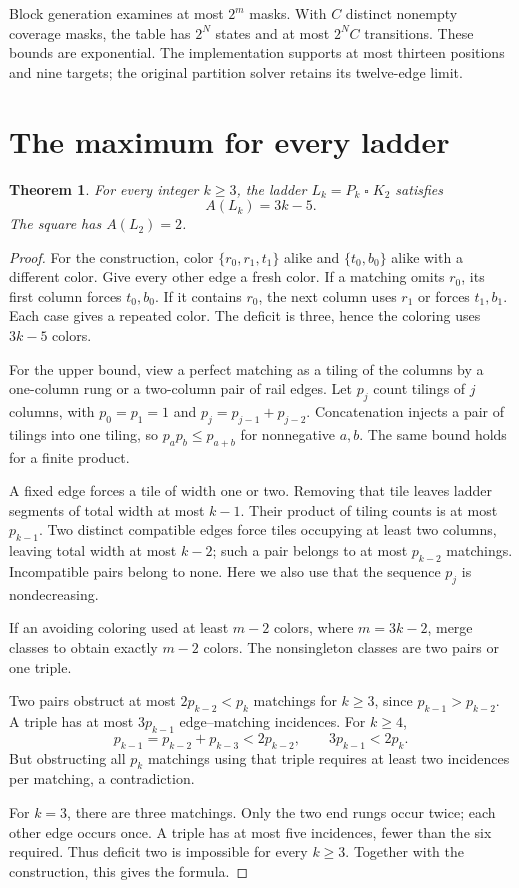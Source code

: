 \documentclass[11pt,letterpaper]{article}
\newtheorem{theorem}{Theorem}
\begin{document}
Block generation examines at most $2^m$ masks. With $C$ distinct nonempty
coverage masks, the table has $2^N$ states and at most $2^N C$ transitions.
These bounds are exponential. The implementation supports at most thirteen
positions and nine targets; the original partition solver retains its
twelve-edge limit.

\newpage
\section{The maximum for every ladder}\label{sec:ladder-family}
\begin{theorem}
For every integer $k\ge3$, the ladder $L_k=P_k\mathbin{\square}K_2$ satisfies
\[
 A(L_k)=3k-5.
\]
The square has $A(L_2)=2$.
\end{theorem}
\begin{proof}
For the construction, color $\{r_0,r_1,t_1\}$ alike and
$\{t_0,b_0\}$ alike with a different color. Give every other edge a fresh
color. If a matching omits $r_0$, its first column forces $t_0,b_0$.
If it contains $r_0$, the next column uses $r_1$ or forces $t_1,b_1$.
Each case gives a repeated color. The deficit is three, hence the coloring
uses $3k-5$ colors.

For the upper bound, view a perfect matching as a tiling of the columns by
a one-column rung or a two-column pair of rail edges. Let $p_j$ count
tilings of $j$ columns, with $p_0=p_1=1$ and
$p_j=p_{j-1}+p_{j-2}$. Concatenation injects a pair of tilings into
one tiling, so $p_a p_b\le p_{a+b}$ for nonnegative $a,b$.
The same bound holds for a finite product.

A fixed edge forces a tile of width one or two. Removing that tile leaves
ladder segments of total width at most $k-1$. Their product of tiling counts
is at most $p_{k-1}$. Two distinct compatible edges force tiles occupying
at least two columns, leaving total width at most $k-2$; such a pair
belongs to at most $p_{k-2}$ matchings. Incompatible pairs belong to none.
Here we also use that the sequence $p_j$ is nondecreasing.

If an avoiding coloring used at least $m-2$ colors, where $m=3k-2$,
merge classes to obtain exactly $m-2$ colors. The nonsingleton classes are
two pairs or one triple.

Two pairs obstruct at most $2p_{k-2}<p_k$ matchings for $k\ge3$,
since $p_{k-1}>p_{k-2}$. A triple has at most $3p_{k-1}$
edge--matching incidences. For $k\ge4$,
\[
 p_{k-1}=p_{k-2}+p_{k-3}<2p_{k-2},
 \qquad 3p_{k-1}<2p_k.
\]
But obstructing all $p_k$ matchings using that triple requires at least
two incidences per matching, a contradiction.

For $k=3$, there are three matchings. Only the two end rungs occur twice;
each other edge occurs once. A triple has at most five incidences, fewer
than the six required. Thus deficit two is impossible for every $k\ge3$.
Together with the construction, this gives the formula.
\end{proof}
\end{document}
